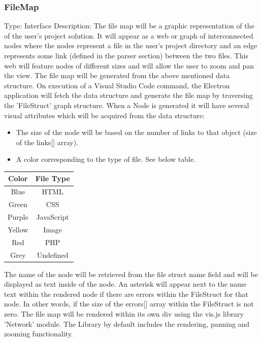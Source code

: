 \documentclass[letterpaper,10pt,titlepage,draftclsnofoot,onecolumn,onesided] {IEEEtran}
\begin{document}
	\subsubsection{FileMap}
	Type: Interface
	Description: 
	The file map will be a graphic representation of the of the user's project solution. 
	It will appear as a web or graph of interconnected nodes where the nodes represent a file in the user's project directory and an edge represents some link (defined in the parser section) between the two files. 
	This web will feature nodes of different sizes and will allow the user to zoom and pan the view.
	The file map will be generated from the above mentioned data structure. 
	On execution of a Visual Studio Code command, the Electron application will fetch the data structure and generate the file map by traversing the 'FileStruct' graph structure. 
	When a Node is generated it will have several visual attributes which will be acquired from the data structure:
	\begin{itemize}
	\item The size of the node will be based on the number of links to that object (size of the links[] array). 
	\item A color corresponding to the type of file. See below table.
	\end{itemize}
	\begin{tabular}{| c | c |}
	\hline
	Color & File Type\\
	\hline
	Blue & HTML\\
	Green & CSS\\
	Purple & JavaScript\\
	Yellow & Image\\
	Red & PHP\\
	Grey & Undefined\\
	\hline
	\end{tabular}
	
	The name of the node will be retrieved from the file struct name field and will be displayed as text inside of the node.
	An asterisk will appear next to the name text within the rendered node if there are errors within the FileStruct for that node. In other words, if the size of the errors[] array within the FileStruct is not zero.
	The file map will be rendered within its own div using the vis.js library 'Network' module. The Library by default includes the rendering, panning and zooming functionality.
	
\end{document}
